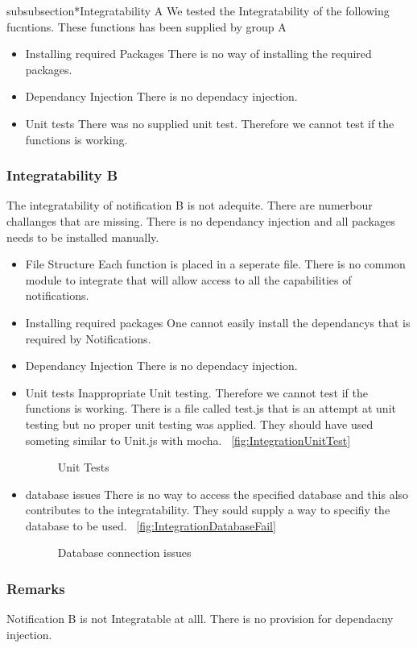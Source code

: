 subsubsection*{Integratability A}
We tested the Integratability of the following fucntions. These functions has been supplied by group A
\begin{itemize}
	\item Installing required Packages
	There is no way of installing the required packages.
	\item Dependancy Injection
	There is no dependacy injection.
	\item Unit tests
	There was no supplied unit test. Therefore we cannot test if the functions is working.
\end{itemize}
\subsubsection*{Integratability B}
The integratability of notification B is not adequite. There are numerbour challanges that are missing. There is no dependancy injection and all packages needs to be installed manually.
\begin{itemize}
	\item {File Structure} 
	Each function is placed in a seperate file. There is no common module to integrate that will allow access to all the capabilities of notifications.
	\item Installing required packages
	One cannot easily install the dependancys that is required by Notifications.
	\item Dependancy Injection
	There is no dependacy injection.
	\item Unit tests
	Inappropriate Unit testing. Therefore we cannot test if the functions is working. There is a file called test.js that is an attempt at unit testing but no proper unit testing was applied. They should have used someting similar to Unit.js with mocha.
		~\ref{fig:IntegrationUnitTest}
		\begin{figure}[H]
			\centering
			\caption{Unit Tests}
			\label{fig:scope}
		\end{figure}
	\item database issues
	There is no way to access the specified database and this also contributes to the integratability. They sould supply a way to specifiy the database to be used.
		~\ref{fig:IntegrationDatabaseFail}
		\begin{figure}[H]
			\centering
			\caption{Database connection issues}
			\label{fig:scope}
		\end{figure}
\end{itemize}
\subsubsection*{Remarks}
Notification B is not Integratable at alll. There is no provision for dependacny injection.